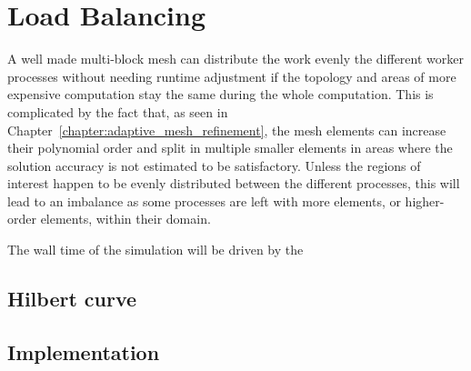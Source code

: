 \chapter{Load Balancing} \label{chapter:load_balancing} 

A well made multi-block mesh can distribute the work evenly the different worker processes without
needing runtime adjustment if the topology and areas of more expensive computation stay the same
during the whole computation. This is complicated by the fact that, as seen in
Chapter~\ref{chapter:adaptive_mesh_refinement}, the mesh elements can increase their polynomial
order and split in multiple smaller elements in areas where the solution accuracy is not estimated
to be satisfactory. Unless the regions of interest happen to be evenly distributed between the
different processes, this will lead to an imbalance as some processes are left with more elements,
or higher-order elements, within their domain.

The wall time of the simulation will be driven by the 

\section{Hilbert curve} \label{section:load_balancing:hilbert_curve}

\section{Implementation} \label{section:load_balancing:implementation}